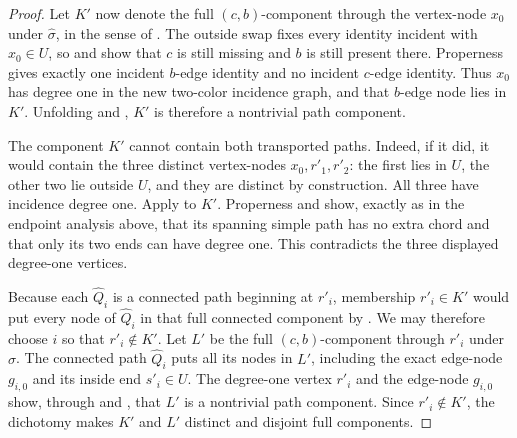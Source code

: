 \begin{proof}
  Let $K'$ now denote the full $(c,b)$-component through the vertex-node
  $x_0$ under $\widehat\sigma$, in the sense of
  .  The outside swap fixes every identity
  incident with $x_0\in U$, so  and
   show that $c$ is still missing and $b$ is still
  present there.  Properness gives exactly one incident $b$-edge identity
  and no incident $c$-edge identity.  Thus $x_0$ has degree one in the new
  two-color incidence graph, and that $b$-edge node lies in $K'$.  Unfolding
   and
  , $K'$ is therefore a
  nontrivial path component.

  The component $K'$ cannot contain both transported paths.  Indeed, if it
  did, it would contain the three distinct vertex-nodes
  $x_0,r'_1,r'_2$: the first lies in $U$, the other two lie outside $U$,
  and they are distinct by construction.  All three have incidence degree
  one.  Apply  to $K'$.  Properness
  and  show, exactly as in the
  endpoint analysis above, that its spanning simple path has no extra chord
  and that only its two ends can have degree one.  This contradicts the
  three displayed degree-one vertices.

  Because each $\widehat Q_i$ is a connected path beginning at $r'_i$,
  membership $r'_i\in K'$ would put every node of $\widehat Q_i$ in that
  full connected component by .  We may
  therefore choose $i$ so that $r'_i\notin K'$.  Let $L'$ be the full
  $(c,b)$-component through $r'_i$ under $\widehat\sigma$.  The connected
  path $\widehat Q_i$ puts all its nodes in $L'$, including the exact
  edge-node $g_{i,0}$ and its inside end $s'_i\in U$.  The degree-one vertex
  $r'_i$ and the edge-node $g_{i,0}$ show, through
   and
  , that $L'$ is a nontrivial path
  component.  Since $r'_i\notin K'$, the dichotomy
   makes $K'$ and $L'$ distinct and
  disjoint full components.


\end{proof}
